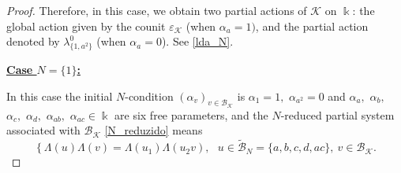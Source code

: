 \documentclass[reqno]{amsart}
\theoremstyle{definition}
\numberwithin{equation}{section}\theoremstyle{plain}
\newcommand{\B}{\mathcal{B}}
\theoremstyle{definition}
\def \k {\Bbbk}
\def \K {\mathcal{K}}
\begin{document}
\begin{proof}
Therefore, in this case, we obtain two partial actions of $\K$ on $\k$: the global action given by the counit $\varepsilon_\K$ (when $\alpha_a=1)$, and the partial action denoted by $\lambda_{\{1,a^2\}}^0$ (when $\alpha_a=0$). See \eqref{lda_N}.

\medbreak

\textbf{\underline{Case $N=\{1\}$:}}

\smallbreak

In this case the initial $N$-condition $(\alpha_v)_{v \in \B_\K}$ is $\alpha_1 = 1,$ $\alpha_{a^2} = 0$ and $\alpha_a,$ $ \alpha_b,$ $\alpha_c,$ $\alpha_{d},$ $\alpha_{ab},$ $\alpha_{ac} \in \k$ are six free parameters, and the $N$-reduced partial system associated with $\B_\K$ \eqref{N_reduzido} means 
\begin{equation*}
\left\{
\Lambda(u)\Lambda(v)
 = \Lambda(u_1)\Lambda(u_2 v), 
\right. \ \ \ u \in \tilde{\B}_N = \{a, b, c, d, ac\}, \ v \in \B_\K.
\end{equation*}


\end{proof}
\end{document}
